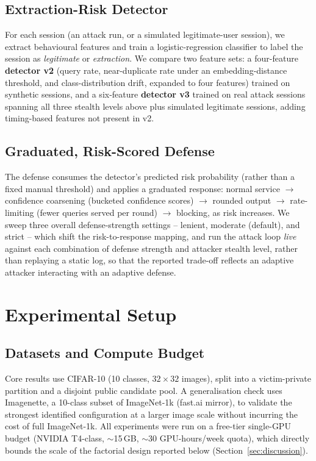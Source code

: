 \documentclass[journal,10pt]{IEEEtran}
\begin{document}
\subsection{Extraction-Risk Detector}

For each session (an attack run, or a simulated legitimate-user session), we extract behavioural
features and train a logistic-regression classifier to label the session as \emph{legitimate} or
\emph{extraction}. We compare two feature sets: a four-feature \textbf{detector v2} (query rate,
near-duplicate rate under an embedding-distance threshold, and class-distribution drift, expanded
to four features) trained on synthetic sessions, and a six-feature \textbf{detector v3} trained on
real attack sessions spanning all three stealth levels above plus simulated legitimate sessions,
adding timing-based features not present in v2.

\subsection{Graduated, Risk-Scored Defense}
\label{sec:defense}

The defense consumes the detector's predicted risk probability (rather than a fixed manual
threshold) and applies a graduated response: normal service $\rightarrow$ confidence coarsening
(bucketed confidence scores) $\rightarrow$ rounded output $\rightarrow$ rate-limiting (fewer
queries served per round) $\rightarrow$ blocking, as risk increases. We sweep three overall
defense-strength settings -- lenient, moderate (default), and strict -- which shift the
risk-to-response mapping, and run the attack loop \emph{live} against each combination of defense
strength and attacker stealth level, rather than replaying a static log, so that the reported
trade-off reflects an adaptive attacker interacting with an adaptive defense.

\section{Experimental Setup}
\label{sec:setup}

\subsection{Datasets and Compute Budget}

Core results use CIFAR-10 (10 classes, $32\times32$ images), split into a victim-private partition
and a disjoint public candidate pool. A generalisation check uses Imagenette, a 10-class subset of
ImageNet-1k (fast.ai mirror), to validate the strongest identified configuration at a larger image
scale without incurring the cost of full ImageNet-1k. All experiments were run on a free-tier
single-GPU budget (NVIDIA T4-class, $\sim$15\,GB, $\sim$30 GPU-hours/week quota), which directly
bounds the scale of the factorial design reported below (Section~\ref{sec:discussion}).
\end{document}
